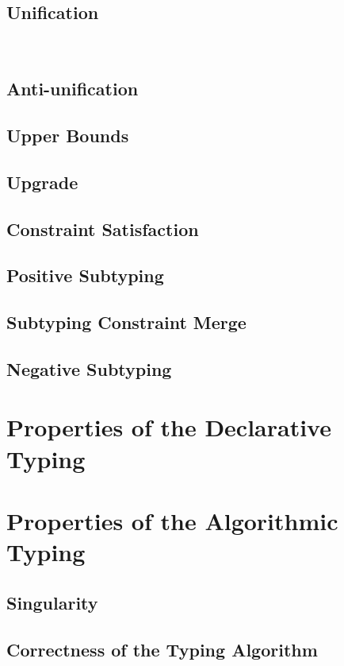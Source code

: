 \documentclass[a4,natbib=false]{article}
\begin{document}
\subsection{Unification}
\

\subsection{Anti-unification}


\subsection{Upper Bounds}


\subsection{Upgrade}


\subsection{Constraint Satisfaction}


\subsection{Positive Subtyping}


\subsection{Subtyping Constraint Merge}


\subsection{Negative Subtyping}





\section{Properties of the Declarative Typing}





\section{Properties of the Algorithmic Typing}

\subsection{Singularity}


\subsection{Correctness of the Typing Algorithm}

\end{document}

